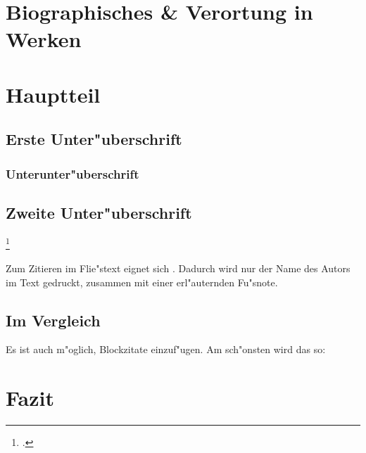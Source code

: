\documentclass[a4paper, 12pt]{article}
\begin{document}

\setcounter{page}{1}

\section{Biographisches \& Verortung in Werken} \label{einleitung}

\blindtext[3]
%

\section{Hauptteil}

\Blindtext


%

\subsection{Erste Unter"uberschrift}
\blindtext
\subsubsection{Unterunter"uberschrift}

\Blindtext

\subsection{Zweite Unter"uberschrift}

\nocite{Jonas.2010}
\nocite{Whitehead.1987}
\nocite{Jonas.2003}

\footcite[vorgestellter Text (bspw "`vgl."')][nachgestellter Text (bspw. Seitenzahl)]{Whitehead.1987}

Zum Zitieren im Flie"stext eignet sich \textcite[vgl.][S. 333]{Whitehead.1987}. Dadurch wird nur der Name des Autors im Text gedruckt, zusammen mit einer erl"auternden Fu"snote.
\subsection{Im Vergleich}
%
Es ist auch m"oglich, Blockzitate einzuf"ugen. Am sch"onsten wird das so:
\begin{footcitedquote}
    \blindtext
\end{footcitedquote}
\section{Fazit}
%

\newpage

\end{document}
